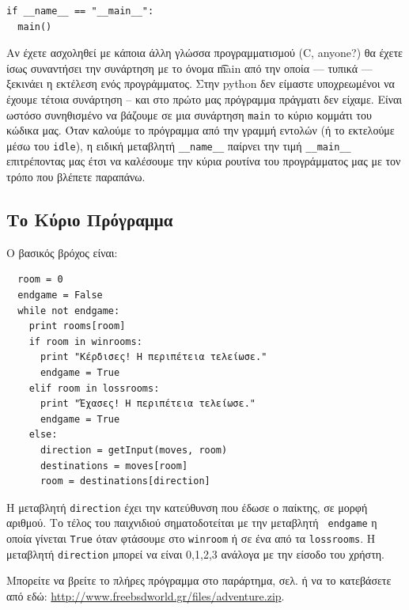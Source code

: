 \begin{verbatim}
if __name__ == "__main__":
  main()
\end{verbatim}

Αν έχετε ασχοληθεί με κάποια άλλη γλώσσα προγραμματισμού (C, anyone?) θα
έχετε ίσως συναντήσει την συνάρτηση με το όνομα {\t main} από την οποία --- τυπικά
--- ξεκινάει η εκτέλεση ενός προγράμματος.  Στην python δεν είμαστε
υποχρεωμένοι να έχουμε τέτοια συνάρτηση -- και στο πρώτο μας πρόγραμμα
πράγματι δεν είχαμε. Είναι ωστόσο συνηθισμένο να βάζουμε σε μια συνάρτηση
{\tt main} το κύριο κομμάτι του κώδικα μας. Όταν καλούμε το πρόγραμμα από την
γραμμή εντολών (ή το εκτελούμε μέσω του {\tt idle}), η ειδική μεταβλητή
{\tt \_\_name\_\_}
παίρνει την τιμή {\tt \_\_main\_\_} επιτρέποντας μας έτσι να καλέσουμε την κύρια
ρουτίνα του προγράμματος μας με τον τρόπο που βλέπετε παραπάνω.
%
\subsection{Το Κύριο Πρόγραμμα}
%
Ο βασικός βρόχος είναι:

\begin{verbatim}
  room = 0
  endgame = False
  while not endgame:
    print rooms[room]
    if room in winrooms:
      print "Κέρδισες! Η περιπέτεια τελείωσε."
      endgame = True
    elif room in lossrooms:
      print "Έχασες! Η περιπέτεια τελείωσε."
      endgame = True
    else:
      direction = getInput(moves, room)
      destinations = moves[room]
      room = destinations[direction]
\end{verbatim}

Η μεταβλητή {\tt direction} έχει την κατεύθυνση που έδωσε ο παίκτης,  σε μορφή
αριθμού. Το τέλος του παιχνιδιού σηματοδοτείται με την μεταβλητή {\tt
endgame} η
οποία γίνεται {\tt True} όταν φτάσουμε στο {\tt winroom} ή σε ένα από τα
{\tt lossrooms}. Η
μεταβλητή {\tt direction} μπορεί να είναι 0,1,2,3 ανάλογα με την είσοδο του
χρήστη.

Μπορείτε να βρείτε το πλήρες πρόγραμμα στο παράρτημα, σελ. \pageref{listing:adventure} ή να το κατεβάσετε από εδώ: \url{http://www.freebsdworld.gr/files/adventure.zip}.
